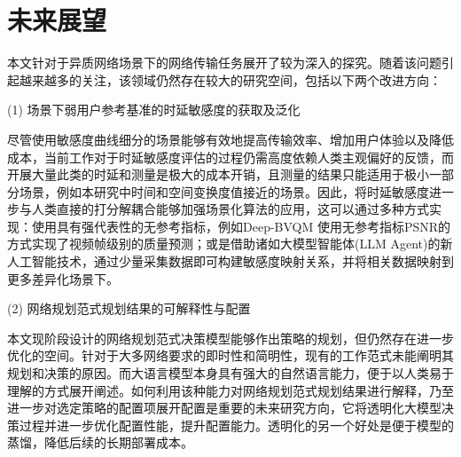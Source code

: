 \section{未来展望}
本文针对于异质网络场景下的网络传输任务展开了较为深入的探究。随着该问题引起越来越多的关注，该领域仍然存在较大的研究空间，包括以下两个改进方向：

(1) 场景下弱用户参考基准的时延敏感度的获取及泛化

尽管使用敏感度曲线细分的场景能够有效地提高传输效率、增加用户体验以及降低成本，当前工作对于时延敏感度评估的过程仍需高度依赖人类主观偏好的反馈，而开展大量此类的时延和测量是极大的成本开销，且测量的结果只能适用于极小一部分场景，例如本研究中时间和空间变换度值接近的场景。因此，将时延敏感度进一步与人类直接的打分解耦合能够加强场景化算法的应用，这可以通过多种方式实现：使用具有强代表性的无参考指标，例如Deep-BVQM \cite{jamshidi2022deep} 使用无参考指标PSNR的方式实现了视频帧级别的质量预测；或是借助诸如大模型智能体(LLM Agent)的新人工智能技术，通过少量采集数据即可构建敏感度映射关系，并将相关数据映射到更多差异化场景下。

(2) 网络规划范式规划结果的可解释性与配置

本文现阶段设计的网络规划范式决策模型能够作出策略的规划，但仍然存在进一步优化的空间。针对于大多网络要求的即时性和简明性，现有的工作范式未能阐明其规划和决策的原因。而大语言模型本身具有强大的自然语言能力，便于以人类易于理解的方式展开阐述。如何利用该种能力对网络规划范式规划结果进行解释，乃至进一步对选定策略的配置项展开配置是重要的未来研究方向，它将透明化大模型决策过程并进一步优化配置性能，提升配置能力。透明化的另一个好处是便于模型的蒸馏，降低后续的长期部署成本。